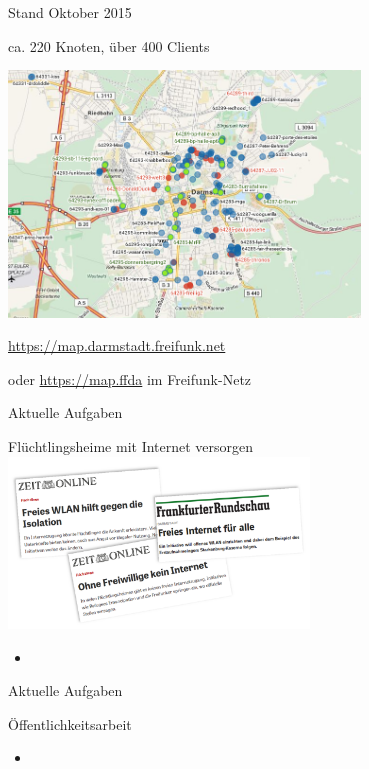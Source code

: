 \documentclass[handout]{beamer}
\begin{document}
\begin{frame}{Stand Oktober 2015}
	\begin{center}
		\vfill
		ca. 220 Knoten, über 400 Clients
		\begin{center}
			\includegraphics[width=0.7\textwidth]{images/2015-10-03_darmstadt-map}
		\end{center}

		\vfill
		\url{https://map.darmstadt.freifunk.net}
		
		\tiny oder \url{https://map.ffda} im Freifunk-Netz
	\end{center}	
\end{frame}

\begin{frame}{Aktuelle Aufgaben}
	\begin{center}
		\large Flüchtlingsheime mit Internet versorgen \\
		\includegraphics[width=0.6\textwidth]{images/2015-10_presse-fluechtlinge}
	\end{center}
	\begin{itemize}[<+->]
		\item 
	\end{itemize}	
\end{frame}	

\begin{frame}{Aktuelle Aufgaben}
	\begin{center}
		\large Öffentlichkeitsarbeit
		\vfill
	\end{center}
	\begin{itemize}[<+->]
		\item 
	\end{itemize}	
\end{frame}
\end{document}
